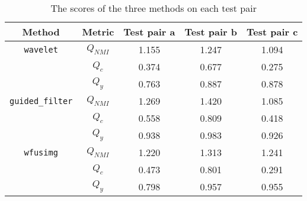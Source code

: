 
\begin{table}[!h]
    \centering
    \caption{The scores of the three methods on each test pair}
    \begin{tabular}{|c|c|c|c|c|}
        \hline
        Method                  & Metric    & Test pair \textbf{a} & Test pair \textbf{b} & Test pair \textbf{c} \\
        \hline
        \hline
        \texttt{wavelet}        & $Q_{NMI}$ & 1.155                & 1.247                & 1.094                \\
                                & $Q_c$     & 0.374                & 0.677                & 0.275                \\
                                & $Q_y$     & 0.763                & 0.887                & 0.878                \\
        \hline
        \texttt{guided\_filter} & $Q_{NMI}$ & 1.269                & 1.420                & 1.085                \\
                                & $Q_c$     & 0.558                & 0.809                & 0.418                \\
                                & $Q_y$     & 0.938                & 0.983                & 0.926                \\
        \hline
        \texttt{wfusimg}        & $Q_{NMI}$ & 1.220                & 1.313                & 1.241                \\
                                & $Q_c$     & 0.473                & 0.801                & 0.291                \\
                                & $Q_y$     & 0.798                & 0.957                & 0.955                \\
        \hline
    \end{tabular}
    \label{tab:my_label}
\end{table}